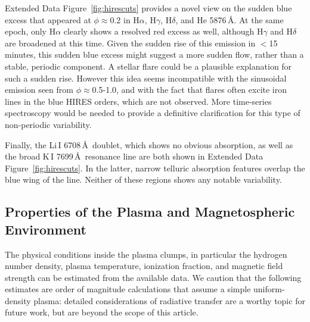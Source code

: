 \documentclass{nature3}
\begin{document}
\begin{methods}
Extended Data Figure~\ref{fig:hirescuts} provides a novel view on the sudden blue
excess that appeared at $\phi$$\approx$0.2 in H$\alpha$, H$\gamma$,
H$\delta$, and He 5876\,\AA.  At the same epoch, only H$\alpha$
clearly shows a resolved red excess as well, although H$\gamma$ and
H$\delta$ are broadened at this time.  Given the sudden rise of this
emission in $<$15\,minutes, this sudden blue excess might suggest a
more sudden flow, rather than a stable, periodic component.  A stellar
flare could be a plausible explanation for such a sudden rise.
However this idea seems incompatible with the sinusoidal emission seen
from $\phi$$\approx$0.5-1.0, and with the fact that flares often
excite iron lines in the blue HIRES orders, which are not observed.
More time-series spectroscopy would be needed to provide a definitive
clarification for this type of non-periodic variability.

Finally, the Li\,\textsc{I} 6708\,\AA\ doublet, which shows no obvious
absorption, as well as the broad K\,\textsc{I} 7699\,\AA\ resonance
line are both shown in Extended Data Figure~\ref{fig:hirescuts}.  In the latter,
narrow telluric absorption features overlap the blue wing of the line.
Neither of these regions shows any notable variability.


\subsection{Properties of the Plasma and Magnetospheric Environment}\phantom{+}
\label{subsec:gas}

The physical conditions inside the plasma clumps, in particular the
hydrogen number density, plasma temperature, ionization fraction, and
magnetic field strength can be estimated from the available data.
We caution that the following estimates are order of magnitude
calculations that assume a simple uniform-density plasma: detailed
considerations of radiative transfer are a worthy topic for future
work, but are beyond the scope of this article.


\end{methods}
\end{document}
